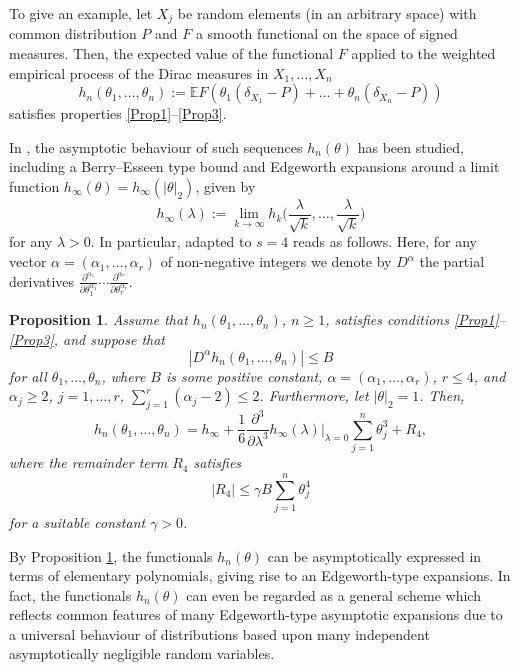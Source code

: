 \documentclass[a4paper,12pt]{amsart}
\numberwithin{equation}{section}
\newtheorem{proposition}[satz]{Proposition}
\theoremstyle{remark}
\def\E{{\mathbb E}}
\begin{document}
To give an example, let $X_j$ be random elements (in an arbitrary space) with common distribution $P$ and $F$ a smooth functional on the space of signed measures. Then, the expected value of the functional $F$ applied to the weighted empirical process of the Dirac measures in $X_1,\ldots,X_n$
\[
h_n(\theta_1,\ldots,\theta_n) := \E F(\theta_1(\delta_{X_1} - P) + \ldots + \theta_n(\delta_{X_n} - P))
\]
satisfies properties \eqref{Prop1}--\eqref{Prop3}.

In \cite{GNU17}, the asymptotic behaviour of such sequences $h_n(\theta)$ has been studied, including a Berry--Esseen type bound and Edgeworth expansions around a limit function $h_\infty(\theta) = h_\infty(|\theta|_2)$, given by
\[
h_\infty(\lambda) := \lim_{k\to \infty} h_k\Big(\frac{\lambda}{\sqrt{k}}, \ldots, \frac{\lambda}{\sqrt{k}}\Big)
\]
for any $\lambda > 0$. In particular, \cite[Th.\ 2.2]{GNU17} adapted to $s=4$ reads as follows. Here, for any vector $\alpha = (\alpha_1, \ldots, \alpha_r)$ of non-negative integers we denote by $D^\alpha$ the partial derivatives $\frac{\partial^{\alpha_1}}{\partial\theta_1^{\alpha_1}}\cdots \frac{\partial^{\alpha_r}}{\partial\theta_r^{\alpha_r}}$.

\begin{proposition}\label{GNU2.2}
Assume that $h_n(\theta_1,\ldots, \theta_n)$, $n \ge 1$, satisfies conditions \eqref{Prop1}--\eqref{Prop3}, and suppose that
\[
|D^\alpha h_n(\theta_1, \ldots, \theta_n)| \le B
\]
for all $\theta_1, \ldots, \theta_n$, where $B$ is some positive constant, $\alpha = (\alpha_1, \ldots, \alpha_r)$, $r \le 4$, and $\alpha_j \ge 2$, $j=1,\ldots, r$, $\sum_{j=1}^r (\alpha_j -2) \le 2$. Furthermore, let $|\theta|_2 = 1$. Then,
\[
h_n(\theta_1, \ldots, \theta_n) = h_\infty + \frac{1}{6} \frac{\partial^3}{\partial \lambda^3} h_\infty(\lambda) \Big|_{\lambda=0} \sum_{j=1}^n\theta_j^3 + R_4,
\]
where the remainder term $R_4$ satisfies
\begin{equation}\label{RemTerm}
|R_4| \le \gamma B \sum_{j=1}^n \theta_j^4
\end{equation}
for a suitable constant $\gamma > 0$.
\end{proposition}

By Proposition \ref{GNU2.2}, the functionals $h_n(\theta)$ can be asymptotically expressed in terms of elementary polynomials, giving rise to an Edgeworth-type expansions. In fact, the functionals $h_n(\theta)$ can even be regarded as a general scheme which reflects common features of many Edgeworth-type asymptotic expansions due to a universal behaviour of distributions based upon many independent asymptotically negligible random variables.
\end{document}
